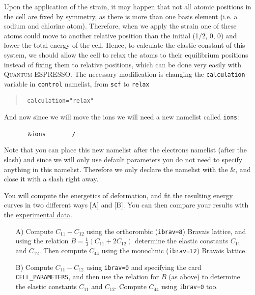 \documentclass[12pt]{article}
\def\QE{\textsc{Quantum ESPRESSO}\xspace}
\begin{document}
Upon the application of the strain, it may happen that not all atomic positions in the
cell are fixed by symmetry, as there is more than one basis element (i.e. a sodium and
chlorine atom). 
Therefore, when we apply the strain one of these atoms could move to another relative
position than the initial (1/2, 0, 0) and lower the total energy of the cell. 
Hence, to calculate the elastic constant of this system, we should allow the cell to
relax the atoms to their equilibrium positions instead of fixing them to relative positions,
which can be done very easily with \QE.
The necessary modification is changing the {\tt calculation} variable in {\tt control} namelist, from {\tt scf} to {\tt relax}
\begin{quotation}
{\tt 
    calculation="relax"
}
\end{quotation}

And now since we will move the ions we will need a new namelist called {\tt ions}:

~~~~~~~{\tt \&ions} 
~~~~~~~{\tt    / }


Note that you can place this new namelist after the electrons namelist (after the slash)
and since we will only use default parameters you do not need to specify anything in this
namelist. 
Therefore we only declare the namelist with the \&, and close it with a slash right away. 
          
You will compute the energetics of deformation, and fit the resulting energy curves in two
different ways [A] and [B].
You can then compare your results with the \href{https://doi.org/10.1016/S0022-3697(72)80468-2}{experimental data}.


\begin{itemize}

\item[A)]
Compute $C_{11}-C_{12}$ using the orthorombic ({\tt ibrav=8}) Bravais lattice, and using
the relation $B = \frac{1}{3} (C_{11} + 2 C_{12})$ determine the elastic constants $C_{11}$
and $C_{12}$. Then compute $C_{44}$ using the monoclinic ({\tt ibrav=12}) Bravais lattice.

\item[B)]
Compute $C_{11}-C_{12}$ using {\tt ibrav=0} and specifying the card {\tt CELL\_PARAMETERS},
and then use the relation for $B$ (as above) to determine the elastic constants $C_{11}$ and
$C_{12}$. Compute $C_{44}$ using {\tt ibrav=0} too.

\end{itemize}
\end{document}
